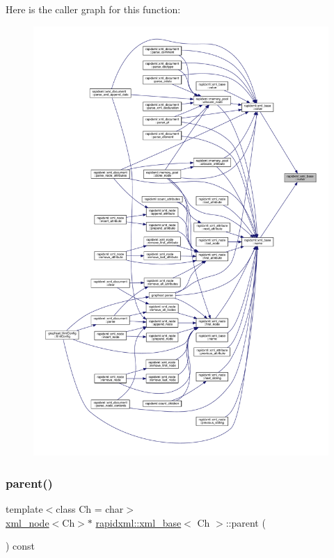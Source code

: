 Here is the caller graph for this function\+:\nopagebreak
\begin{figure}[H]
\begin{center}
\leavevmode
\includegraphics[width=350pt]{classrapidxml_1_1xml__base_ad96ff6b1e41dab3ff60b9bc4df769a75_icgraph}
\end{center}
\end{figure}
\mbox{\label{classrapidxml_1_1xml__base_aa807062868d671a8c798d9d1bf016988}} 
\subsubsection{\texorpdfstring{parent()}{parent()}}
{\footnotesize\ttfamily template$<$class Ch  = char$>$ \\
\mbox{\hyperlink{classrapidxml_1_1xml__node}{xml\+\_\+node}}$<$Ch$>$$\ast$ \mbox{\hyperlink{classrapidxml_1_1xml__base}{rapidxml\+::xml\+\_\+base}}$<$ Ch $>$\+::parent (\begin{DoxyParamCaption}{ }\end{DoxyParamCaption}) const\hspace{0.3cm}{\ttfamily [inline]}}

